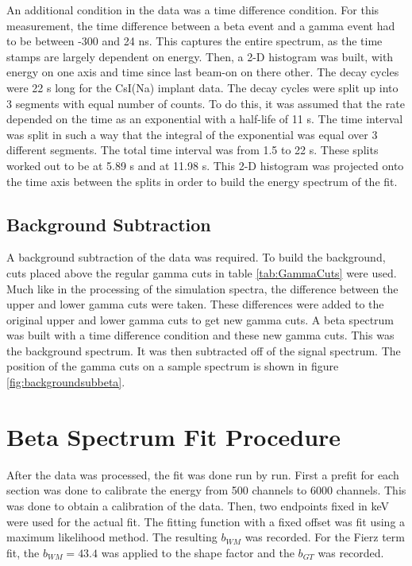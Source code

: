 \documentclass[../MaxHughesThesis.tex]{subfiles}
\begin{document}
An additional condition in the data was a time difference condition.
For this measurement, the time difference between a beta event and a gamma event had to be between -300 and 24 ns.
This captures the entire spectrum, as the time stamps are largely dependent on energy. 
Then, a 2-D histogram was built, with energy on one axis and time since last beam-on on there other.
The decay cycles were 22 s long for the CsI(Na) implant data. 
The decay cycles were split up into 3 segments with equal number of counts.
To do this, it was assumed that the rate depended on the time as an exponential with a half-life of 11 s.
The time interval was split in such a way that the integral of the exponential was equal over 3 different segments.
The total time interval was from 1.5 to 22 s.
These splits worked out to be at 5.89 s and at 11.98 s. 
This 2-D histogram was projected onto the time axis between the splits in order to build the energy spectrum of the fit. 

\subsection{Background Subtraction}

A background subtraction of the data was required.
To build the background, cuts placed above the regular gamma cuts in table \ref{tab:GammaCuts} were used.
Much like in the processing of the simulation spectra, the difference between the upper and lower gamma cuts were taken.
These differences were added to the original upper and lower gamma cuts to get new gamma cuts.
A beta spectrum was built with a time difference condition and these new gamma cuts.
This was the background spectrum.
It was then subtracted off of the signal spectrum. 
The position of the gamma cuts on a sample spectrum is shown in figure \ref{fig:backgroundsubbeta}.


\section{Beta Spectrum Fit Procedure}
After the data was processed, the fit was done run by run.
First a prefit for each section was done to calibrate the energy from 500 channels to 6000 channels.
This was done to obtain a calibration of the data.
Then, two endpoints fixed in keV were used for the actual fit.
The fitting function with a fixed offset was fit using a maximum likelihood method.
The resulting $b_{WM}$ was recorded.
For the Fierz term fit, the $b_{WM} = 43.4$ was applied to the shape factor and the $b_{GT}$ was recorded.
\end{document}
